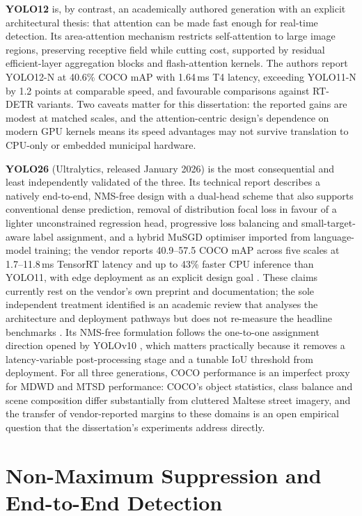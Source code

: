 \textbf{YOLO12} \citep{tian2025yolov12} is, by contrast, an academically authored generation with an explicit architectural thesis: that attention can be made fast enough for real-time detection. Its area-attention mechanism restricts self-attention to large image regions, preserving receptive field while cutting cost, supported by residual efficient-layer aggregation blocks and flash-attention kernels. The authors report YOLO12-N at 40.6\% COCO mAP with 1.64\,ms T4 latency, exceeding YOLO11-N by 1.2 points at comparable speed, and favourable comparisons against RT-DETR variants. Two caveats matter for this dissertation: the reported gains are modest at matched scales, and the attention-centric design's dependence on modern GPU kernels means its speed advantages may not survive translation to CPU-only or embedded municipal hardware.

\textbf{YOLO26} (Ultralytics, released January 2026) is the most consequential and least independently validated of the three. Its technical report describes a natively end-to-end, NMS-free design with a dual-head scheme that also supports conventional dense prediction, removal of distribution focal loss in favour of a lighter unconstrained regression head, progressive loss balancing and small-target-aware label assignment, and a hybrid MuSGD optimiser imported from language-model training; the vendor reports 40.9--57.5 COCO mAP across five scales at 1.7--11.8\,ms TensorRT latency and up to 43\% faster CPU inference than YOLO11, with edge deployment as an explicit design goal \citep{jocher2026yolo26,ultralytics2026yolo26docs}. These claims currently rest on the vendor's own preprint and documentation; the sole independent treatment identified is an academic review that analyses the architecture and deployment pathways but does not re-measure the headline benchmarks \citep{sapkota2025yolo26}. Its NMS-free formulation follows the one-to-one assignment direction opened by YOLOv10 \citep{wang2024yolov10}, which matters practically because it removes a latency-variable post-processing stage and a tunable IoU threshold from deployment. For all three generations, COCO performance is an imperfect proxy for MDWD and MTSD performance: COCO's object statistics, class balance and scene composition differ substantially from cluttered Maltese street imagery, and the transfer of vendor-reported margins to these domains is an open empirical question that the dissertation's experiments address directly.

\section{Non-Maximum Suppression and End-to-End Detection}
\label{sec:lr-nms}

